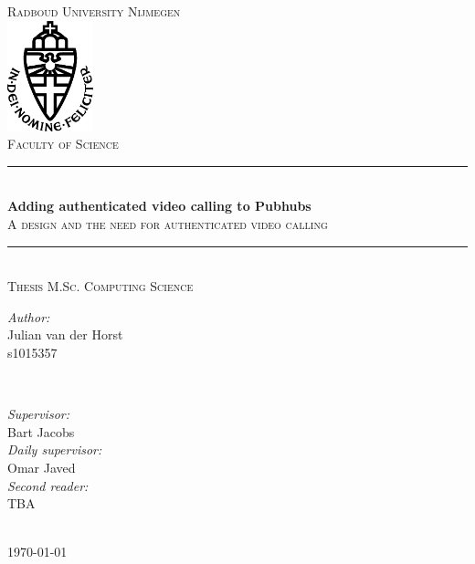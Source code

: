 \documentclass{report}
\title{\thesistitle}
\author{\thesisauthorfirst\space\thesisauthorsecond}
\date{\thesisdate}
\newcommand{\thesistitle}{Adding authenticated video calling to Pubhubs}
\newcommand{\thesissubtitle}{A design and the need for authenticated video calling}
\newcommand\thesisauthorfirst{Julian van der Horst \\ s1015357}
\newcommand\thesisauthorsecond{}
\newcommand\thesissupervisorfirst{Bart Jacobs}
\newcommand\thesissupervisorsecond{Omar Javed}
\newcommand\thesissecondreaderfirst{TBA}
\newcommand\thesissecondreadersecond{Bram Westerbaan}
\newcommand\thesisdate{Febrauri 2024}
\begin{document}
\begin{titlepage}
\thispagestyle{empty}
\newcommand{\HRule}{\rule{\linewidth}{0.5mm}}
\center
\textsc{\Large Radboud University Nijmegen}\\[.7cm]
\includegraphics[width=25mm]{img/in_dei_nomine_feliciter}\\[.5cm]
\textsc{Faculty of Science}\\[0.5cm]

\HRule \\[0.4cm]
{ \huge \bfseries \thesistitle}\\[0.1cm]
\textsc{\thesissubtitle}\\
\HRule \\[.5cm]
\textsc{\large Thesis M.Sc. Computing Science}\\[.5cm]

\begin{minipage}{0.4\textwidth}
    \begin{flushleft}
        \large
        \emph{Author:}\\
        \thesisauthorfirst\space \textsc{\thesisauthorsecond}
    \end{flushleft}
\end{minipage}
~
\begin{minipage}{0.4\textwidth}
    \begin{flushright}
        \large
        \emph{Supervisor:} \\
        \thesissupervisorfirst  \\[1em]
        \emph{Daily supervisor:} \\
        \thesissupervisorsecond \\[1em]
        \emph{Second reader:} \\
        \thesissecondreaderfirst\\
    \end{flushright}
\end{minipage}\\[4cm]
\vfill
{\large \today}\\
\clearpage
\end{titlepage}
\end{document}
